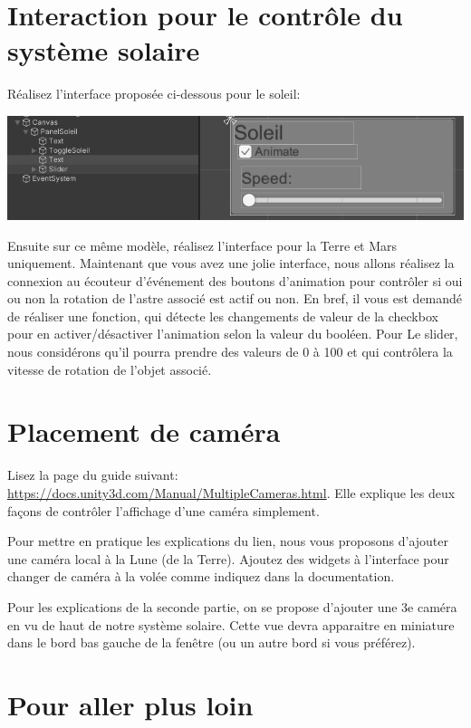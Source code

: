 \documentclass[a4paper,10pt]{article}
\begin{document}
\section{Interaction pour le contrôle du système solaire}

Réalisez l'interface proposée ci-dessous pour le soleil:
\begin{center}
	\includegraphics[width=0.7\linewidth]{rc/ui_control_sun_planet}
\end{center}

Ensuite sur ce même modèle, réalisez l'interface pour la Terre et Mars uniquement. Maintenant que vous avez une jolie interface, nous allons réalisez la connexion au écouteur d'événement des boutons d'animation pour contrôler si oui ou non la rotation de l'astre associé est actif ou non. En bref, il vous est demandé de réaliser une fonction, qui détecte les changements de valeur de la checkbox pour en activer/désactiver l'animation selon la valeur du booléen. 
Pour Le slider, nous considérons qu'il pourra prendre des valeurs de 0 à 100 et qui contrôlera la vitesse de rotation de l'objet associé.


\section{Placement de caméra}

Lisez la page du guide suivant: \url{https://docs.unity3d.com/Manual/MultipleCameras.html}. Elle explique les deux façons de contrôler l'affichage d'une caméra simplement.

Pour mettre en pratique les explications du lien, nous vous proposons d'ajouter une caméra local à la Lune (de la Terre). Ajoutez des widgets à l'interface pour changer de caméra à la volée comme indiquez dans la documentation.

Pour les explications de la seconde partie, on se propose d'ajouter une 3e caméra en vu de haut de notre système solaire. Cette vue devra apparaitre en miniature dans le bord bas gauche de la fenêtre (ou un autre bord si vous préférez).


\section{Pour aller plus loin}
\end{document}
